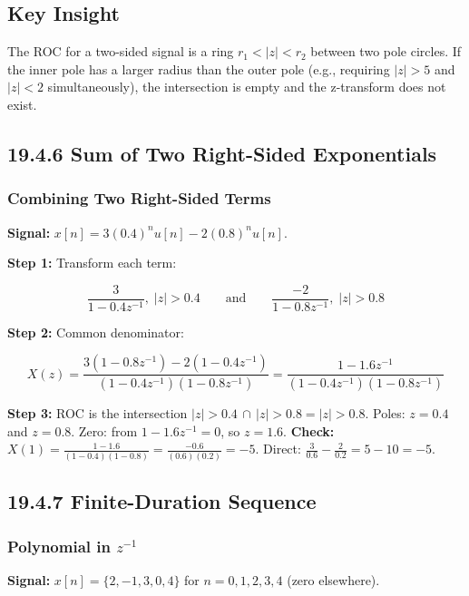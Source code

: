\documentclass[11pt]{article}
\begin{document}
\subsection*{Key Insight}

The ROC for a two-sided signal is a ring $r_1 < |z| < r_2$ between two pole circles. If the inner pole has a larger radius than the outer pole (e.g., requiring $|z| > 5$ and $|z| < 2$ simultaneously), the intersection is empty and the z-transform does not exist.

\subsection*{19.4.6 Sum of Two Right-Sided Exponentials}

\subsubsection*{Combining Two Right-Sided Terms}

\textbf{Signal:} $x[n] = 3(0.4)^n u[n] - 2(0.8)^n u[n]$.

\textbf{Step 1:} Transform each term:

\[\frac{3}{1 - 0.4 z^{-1}},\; |z| > 0.4 \qquad \text{and} \qquad \frac{-2}{1 - 0.8 z^{-1}},\; |z| > 0.8\]

\textbf{Step 2:} Common denominator:

\[X(z) = \frac{3(1 - 0.8 z^{-1}) - 2(1 - 0.4 z^{-1})}{(1 - 0.4 z^{-1})(1 - 0.8 z^{-1})} = \frac{1 - 1.6 z^{-1}}{(1 - 0.4 z^{-1})(1 - 0.8 z^{-1})}\]

\textbf{Step 3:} ROC is the intersection $|z| > 0.4 \,\cap\, |z| > 0.8 = |z| > 0.8$.
Poles: $z = 0.4$ and $z = 0.8$. Zero: from $1 - 1.6 z^{-1} = 0$, so $z = 1.6$.
\textbf{Check:} $X(1) = \frac{1 - 1.6}{(1 - 0.4)(1 - 0.8)} = \frac{-0.6}{(0.6)(0.2)} = -5$. Direct: $\frac{3}{0.6} - \frac{2}{0.2} = 5 - 10 = -5$. \checkmark

\subsection*{19.4.7 Finite-Duration Sequence}

\subsubsection*{Polynomial in $z^{-1}$}

\textbf{Signal:} $x[n] = \{2, -1, 3, 0, 4\}$ for $n = 0, 1, 2, 3, 4$ (zero elsewhere).
\end{document}
